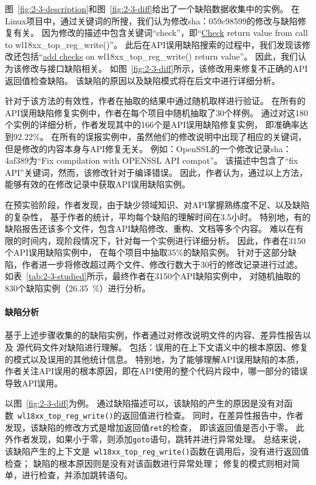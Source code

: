 图~\ref{fig:2-3-description}和图~\ref{fig:2-3-diff}给出了一个缺陷数据收集中的实例。
在Linux项目中，通过关键词的所搜，我们认为修改sha：059c98599的修改与缺陷修复有关。
因为修改的描述中包含关键词“check”，即“\underline{Check} return value from call to wl18xx\_top\_reg\_write()”。
此后在API误用缺陷搜索的过程中，我们发现该修改还包括“\underline{add checks} on wl18xx\_top\_reg\_write() return value”。
因此，我们认为该修改与接口缺陷相关。
如图~\ref{fig:2-3-diff}所示，该修改用来修复不正确的API返回值检查缺陷。
该缺陷的原因以及缺陷模式将在后文中进行详细分析。

针对于该方法的有效性，作者在抽取的结果中通过随机取样进行验证。
在所有的API误用缺陷修复实例中，作者在每个项目中随机抽取了30个样例。
通过对这180个实例的详细分析，作者发现其中的166个是API误用缺陷修复实例，
即准确率达到92.22\%。
在所有的误报实例中，虽然他们的修改说明中出现了相应的关键词，
但是修改的内容本身与API修复无关。
例如：OpenSSL的一个修改记录sha：4af389为“Fix compilation with OPENSSL API compat”。
该描述中包含了“fix API”关键词，然而，该修改针对于编译错误。
因此，作者认为，通过以上方法，能够有效的在修改记录中获取API误用缺陷实例。



在预实验阶段，作者发现，由于缺少领域知识、对API掌握熟练度不足、以及缺陷的复杂性，
基于作者的统计，平均每个缺陷的理解时间在3.5小时。
特别地，有的缺陷报告还该多个文件，包含API缺陷修改、重构、文档等多个内容。
难以在有限的时间内，现阶段情况下，针对每一个实例进行详细分析。
因此，作者在3150个API误用缺陷实例中，
在每个项目中抽取35\%的缺陷实例。
针对于这部分缺陷，作者进一步将修改超过两个文件、修改行数大于30行的修改记录进行过滤。
如表~\ref{tab:2-3-studied}所示，最终作者在3150个API缺陷实例中，
对随机抽取的830个缺陷实例（26.35~\%）进行分析。

\paragraph{缺陷分析}
基于上述步骤收集的的缺陷实例，作者通过对修改说明文件的内容、差异性报告以及
源代码文件对缺陷进行理解。
包括：误用的在上下文语义中的根本原因、修复的模式以及误用的其他统计信息。
特别地，为了能够理解API误用缺陷的本质，
作者关注API误用的根本原因，即在API使用的整个代码片段中，哪一部分的错误导致API误用。

以图~\ref{fig:2-3-diff}为例。
通过缺陷描述可以，该缺陷的产生的原因是没有对函数~\texttt{wl18xx\_top\_reg\_write()}的返回值进行检查。
同时，在差异性报告中，作者发现，该缺陷的修改方式是增加返回值\texttt{ret}的检查，
即该返回值是否小于零。
此外作者发现，如果小于零，则添加\texttt{goto}语句，跳转并进行异常处理。
总结来说，该缺陷产生的上下文是~\texttt{wl18xx\_top\_reg\_write()}函数在调用后，没有进行返回值检查；
缺陷的根本原因则是没有对该函数进行异常处理；
修复的模式则相对简单，进行检查，并添加跳转语句。

